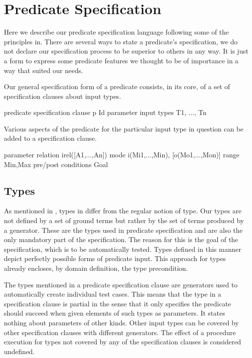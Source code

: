 
\section{Predicate Specification}
\label{sec:pred-spec}

Here we describe our predicate specification language following some of
the principles in.
%
There are several ways to state a predicate's specification, we do not
declare our specification process to be superior to others in any way.
%
It is just a form to express some predicate features we thought to be of
importance in a way that suited our needs.


Our general specification form of a predicate  consists, in its
core, of a set of specification clauses about input types.
%
\begin{code}
predicate specification clause
  p Id
parameter input types
  T1, ..., Tn
\end{code}
%
Various aspects of the predicate for the particular input type in
question can be added to a specification clause.
%
\begin{code}
parameter relation
  irel([A1,...,An])
mode
  i(Mi1,...,Min), [o(Mo1,...,Mon)]
range
  {Min,Max}
pre/post conditions
  Goal
\end{code}


\subsection{Types}

As mentioned in , types in \plqc{} differ from
the regular notion of type.
%
Our types are not defined by a set of ground terms but rather by the set
of terms produced by a generator.
%
These are the types used in predicate specification and are also
the only mandatory part of the specification.
%
The reason for this is the goal of the specification, which is to be
automatically tested.
%
Types defined in this manner depict perfectly possible forms of
predicate input.
%
This approach for types already encloses, by domain definition, the type
precondition.



The types mentioned in a predicate specification clause are \plqc{}
generators used to automatically create individual test cases.
%
This means that the type in a specification clause is partial in the
sense that it only specifies the predicate should succeed when given
elements of such types as parameters.
%
It states nothing about parameters of other kinds.
%
Other input types can be covered by other specification clauses with
different generators.
%
The effect of a procedure execution for types not covered by any of the
specification clauses is considered undefined.


